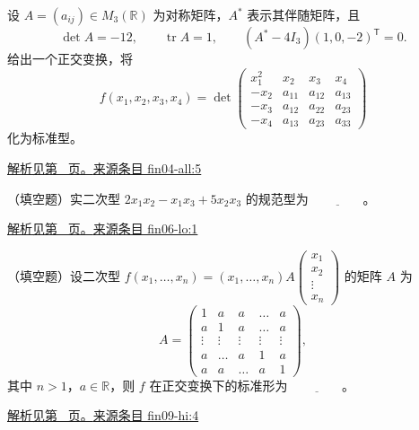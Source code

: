 \documentclass[UTF8,12pt,a4paper,fontset=fandol]{ctexart}
\begin{document}
\begin{example}\label{ex:fin04-all:5}

设 $A=(a_{ij})\in M_3(\mathbb R)$ 为对称矩阵，$A^*$ 表示其伴随矩阵，且
\[
\det A=-12,\qquad\operatorname{tr}A=1,\qquad
(A^*-4I_3)(1,0,-2)^{\mathsf T}=0.
\]
给出一个正交变换，将
\[
f(x_1,x_2,x_3,x_4)=
\det\begin{pmatrix}
x_1^2&x_2&x_3&x_4\\
-x_2&a_{11}&a_{12}&a_{13}\\
-x_3&a_{12}&a_{22}&a_{23}\\
-x_4&a_{13}&a_{23}&a_{33}
\end{pmatrix}
\]
化为标准型。

\par\hyperref[ans:fin04-all:5]{解析见第~\pageref{ans:fin04-all:5} 页。}\quad\href{https://github.com/lzxcr/cmc-mathematics/blob/64916fa1fdbc3e444a652eca204d5669058ee321/src/problems/finals/04/05.md}{来源条目 fin04-all:5}

\end{example}

\begin{example}\label{ex:fin06-lo:1}

（填空题）实二次型 $2x_1x_2-x_1x_3+5x_2x_3$ 的规范型为 $\underline{\qquad\qquad}$。

\par\hyperref[ans:fin06-lo:1]{解析见第~\pageref{ans:fin06-lo:1} 页。}\quad\href{https://github.com/lzxcr/cmc-mathematics/blob/64916fa1fdbc3e444a652eca204d5669058ee321/src/problems/finals/06/01.md}{来源条目 fin06-lo:1}

\end{example}

\begin{example}\label{ex:fin09-hi:4}

（填空题）设二次型 $f(x_{1},\dots,x_{n})=(x_{1},\dots,x_{n})A\begin{pmatrix}x_{1}\\x_{2}\\\vdots\\x_{n}\end{pmatrix}$ 的矩阵 $A$ 为
\[
A=\begin{pmatrix}1&a&a&\dots&a\\a&1&a&\dots&a\\\vdots&\vdots&\vdots&\vdots&\vdots\\a&\dots&a&1&a\\a&a&\dots&a&1\end{pmatrix},
\]
其中 $n>1$，$a \in \mathbb{R}$，则 $f$ 在正交变换下的标准形为 $\underline{\qquad\qquad}$。

\par\hyperref[ans:fin09-hi:4]{解析见第~\pageref{ans:fin09-hi:4} 页。}\quad\href{https://github.com/lzxcr/cmc-mathematics/blob/64916fa1fdbc3e444a652eca204d5669058ee321/src/problems/finals/09/04.md}{来源条目 fin09-hi:4}

\end{example}
\end{document}
